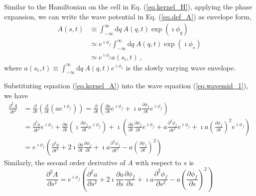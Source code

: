 Similar to the Hamiltonian on the cell in Eq. (\ref{eq.kernel_H}), applying the phase expansion, we can write the wave potential in Eq. (\ref{eq.def_A}) as envelope form,
\begin{equation}\label{eq.kernel_A}
    \begin{aligned}
    A(s,t) &\equiv \int_{-\infty}^{\infty}\mathrm{d} q~ A\left(q,t\right) \exp(\imath\phi_{q})
    \\
    & \simeq e^{\imath \phi_f} \int_{-\infty}^{\infty}\mathrm{d} q~ A\left(q,t\right) \exp(\imath\phi_{s})
    \\
    & \simeq e^{\imath \phi_f}  a(s_i, t)~,
    \end{aligned}
\end{equation}
where $a(s_i, t) \equiv \int_{-\infty}^{\infty} \mathrm{d} q~A(q, t) e^{\imath \phi_{s}}$ is the slowly varying wave envelope.

Substituting equation (\ref{eq.kernel_A}) into the wave equation (\ref{eq.wavemid_1}), we have 
\begin{equation}
    \begin{aligned}
    \frac{\partial^2  A}{\partial t^2} &= \frac{\partial }{\partial t}\left(\frac{\partial }{\partial t}(a e^{\imath \phi_f})\right) = \frac{\partial }{\partial t}\left(\frac{\partial a}{\partial t} e^{\imath \phi_f} + \imath a \frac{\partial \phi_f}{\partial t}e^{\imath \phi_f} \right)
    \\
    & = \frac{\partial^2 a}{\partial t^2} e^{\imath \phi_f} + \frac{\partial a}{\partial t} (\imath \frac{\partial \phi_f}{\partial t} e^{\imath \phi_f}) +
     \imath \left(\frac{\partial a}{\partial t} \frac{\partial \phi_f}{\partial t}e^{\imath \phi_f} + a \frac{\partial ^2 \phi_f}{\partial t^2}e^{\imath \phi_f} + \imath a \left(\frac{\partial \phi_f}{\partial t}\right)^2e^{\imath \phi_f}  \right)
     \\
     & = e^{\imath \phi_f} \left(\frac{\partial^2 a}{\partial t^2} + 2 \imath \frac{\partial a}{\partial t}\frac{\partial \phi_f}{\partial t} + \imath a \frac{\partial^2 \phi_f}{\partial t^2} - a \left(\frac{\partial \phi_f}{\partial t}\right)^2\right)
    \end{aligned}
\end{equation}
Similarly, the second order derivative of $A$ with respect to $s$ is 
\begin{equation}
    \frac{\partial^2  A}{\partial s^2} = e^{\imath \phi_f} \left(\frac{\partial^2 a}{\partial s^2} + 2 \imath \frac{\partial a}{\partial s}\frac{\partial \phi_f}{\partial s} + \imath a \frac{\partial^2 \phi_f}{\partial s^2} - a \left(\frac{\partial \phi_f}{\partial s}\right)^2\right)
\end{equation}

